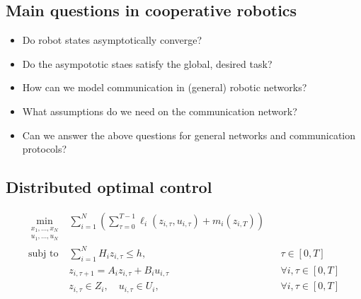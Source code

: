 \documentclass{book}
\theoremstyle{theoremv2}
\theoremstyle{defv2}
\theoremstyle{remark}
\theoremstyle{remark}
\theoremstyle{definition}
\theoremstyle{definition}
\begin{document}
\subsection{Main questions in cooperative robotics}
\begin{itemize}
    \item Do robot states asymptotically converge? 
    \item Do the asympototic staes satisfy the global, desired task?
    \item How can we model communication in (general) robotic networks?
    \item What assumptions do we need on the communication network?
    \item Can we answer the above questions for general networks and communication protocols?
\end{itemize}
\subsection{Distributed optimal control}
\begin{align*}
    \min_{\substack{x_1,\dots,x_N \\ u_1,\dots,u_N}} & \displaystyle\sum_{i=1}^{N}(\displaystyle\sum_{\tau=0}^{T-1}\ell_i(z_{i,\tau},u_{i,\tau})+m_i(z_{i,T}))\\
    \text{subj to} & \displaystyle\sum_{i=1}^{N}H_iz_{i,\tau}\leq h, && \tau\in[0,T]\\ 
    & z_{i,\tau+1}=A_iz_{i,\tau}+B_iu_{i,\tau} && \forall i, \tau \in [0,T]\\ 
    & z_{i,\tau}\in Z_i, \quad u_{i,\tau}\in U_i, && \forall i, \tau \in [0,T]\\ 
\end{align*}
\end{document}
